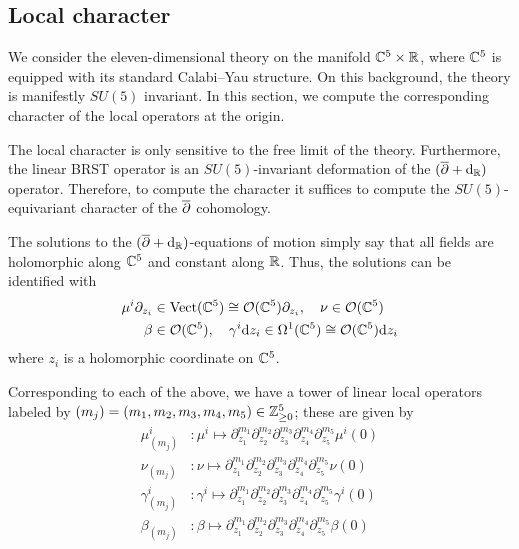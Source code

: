 \subsection{Local character}\label{sec:locchar}

We consider the eleven-dimensional theory on the manifold $\mathbb C^5 \times \mathbb R$, where $\mathbb C^5$ is equipped with its standard Calabi--Yau structure. 
On this background, the theory is manifestly $SU(5)$ invariant. 
In this section, we compute the corresponding character of the local operators at the origin. 

The local character is only sensitive to the free limit of the theory.
Furthermore, the linear BRST operator is an $SU(5)$-invariant deformation of the $(\overline{\partial} + {\rm d}_{\mathbb R})$ operator. 
Therefore, to compute the character it suffices to compute the $SU(5)$-equivariant character of the $\overline{\partial}$ cohomology. 

The solutions to the $(\overline{\partial} + {\rm d}_{\mathbb R})$-equations of motion simply say that all fields are holomorphic along $\mathbb C^5$ and constant along $\mathbb R$. 
Thus, the solutions can be identified with 
\begin{align*}
\mu^{i}\partial_{z_i} & \in {\rm Vect}(\mathbb C^5) \cong \mathcal O(\mathbb{C}^5)\partial_{z_i},\quad 
\nu \in \mathcal O (\mathbb{C}^5) \\
\beta & \in \mathcal O (\mathbb{C}^5), \quad \gamma^{i} {\rm d} z_i \in \Omega^{1}(\mathbb C^5) \cong \mathcal O (\mathbb{C}^5){\rm d} z_i 
\end{align*}
where $z_i$ is a holomorphic coordinate on $\mathbb C^5$. 

Corresponding to each of the above, we have a tower of linear local operators labeled by $(m_j) = (m_1, m_2, m_3, m_4, m_5)\in \mathbb{Z}^5_{\geq 0}$; these are given by
\begin{align*}
 \mu^{i}_{(m_j)} &: \mu^{i}\mapsto \partial_{z_1}^{m_1}\partial_{z_2}^{m_2}\partial_{z_3}^{m_3}\partial_{z_4}^{m_4}\partial_{z_5}^{m_5}\mu^{i} (0) \\
\nu_{(m_j)} &: \nu\mapsto \partial_{z_1}^{m_1}\partial_{z_2}^{m_2}\partial_{z_3}^{m_3}\partial_{z_4}^{m_4}\partial_{z_5}^{m_5}\nu (0) \\
\gamma^{i}_{(m_j)} &: \gamma^{i}\mapsto \partial_{z_1}^{m_1}\partial_{z_2}^{m_2}\partial_{z_3}^{m_3}\partial_{z_4}^{m_4}\partial_{z_5}^{m_5}\gamma^{i} (0) \\
 \beta_{(m_j)} &: \beta\mapsto \partial_{z_1}^{m_1}\partial_{z_2}^{m_2}\partial_{z_3}^{m_3}\partial_{z_4}^{m_4}\partial_{z_5}^{m_5}\beta (0) \\
\end{align*}

